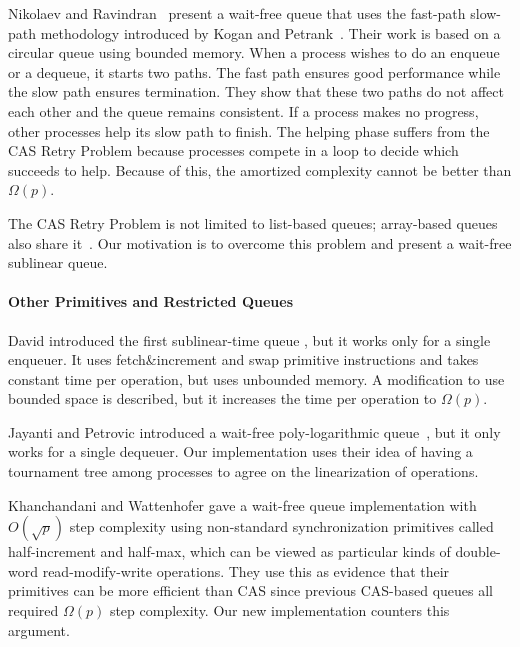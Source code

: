 Nikolaev and Ravindran~\cite{10.1145/3490148.3538572} present a
wait-free queue that uses the fast-path slow-path methodology
introduced by Kogan and Petrank~\cite{10.1145/2370036.2145835}. Their
work is based on a circular queue using bounded memory. When a process
wishes to do an enqueue or a dequeue, it starts two paths. The fast
path  ensures good performance while the slow path ensures
termination. They show that these two paths do not affect each other
and the queue remains consistent. If a process makes no progress,
other processes help its slow path to finish. The helping phase
suffers from the CAS Retry Problem because processes compete in a
 loop to decide which succeeds to help. Because of this, the
amortized complexity cannot be better than $\Omega(p)$. 

The CAS Retry Problem is not limited to list-based queues; array-based
queues also share
it~\cite{DBLP:conf/iceccs/ColvinG05,DBLP:conf/icdcn/Shafiei09,DBLP:conf/spaa/TsigasZ01}.
Our motivation is to overcome this problem and present a wait-free
sublinear queue. 


\paragraph{Other Primitives and Restricted Queues}

David introduced the first sublinear-time queue
\cite{DBLP:conf/wdag/David04}, but it works only for a single enqueuer.
It uses fetch\&increment and swap primitive instructions and takes constant time per operation, but
uses unbounded memory.  A modification to use bounded space
is described, but it increases the time per operation to $\Omega(p)$.

Jayanti and Petrovic introduced a wait-free poly-logarithmic
queue~\cite{DBLP:conf/fsttcs/JayantiP05}, but it only works for a single dequeuer. 
Our implementation uses their idea of having
a tournament tree among processes to agree on the linearization of
operations.

Khanchandani and Wattenhofer \cite{KW18} gave a wait-free queue implementation
with $O(\sqrt{p})$ step complexity using non-standard synchronization primitives
called half-increment and half-max, which can be viewed as particular kinds of
double-word read-modify-write operations.
They use this as evidence that their primitives can be more efficient than CAS
since previous CAS-based queues all required $\Omega(p)$ step complexity.
Our new implementation counters this argument.


